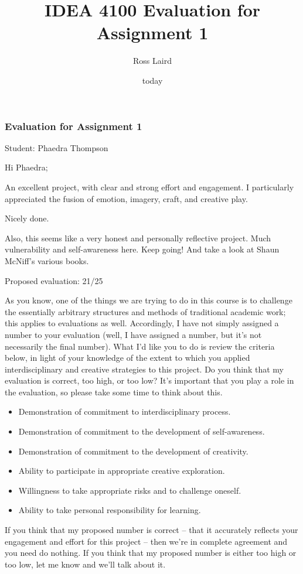 \documentclass[letterpaper,10pt,DIV=9,headsepline]{scrreprt}
\author{Ross Laird}
\title{IDEA 4100 Evaluation for Assignment 1}
\date{today}
\begin{document}
\pagestyle{scrheadings}
\setcounter{secnumdepth}{-1}

\subsubsection{Evaluation for Assignment 1}

Student: Phaedra Thompson

\bigskip
Hi Phaedra;

An excellent project, with clear and strong effort and engagement. I
particularly appreciated the fusion of emotion, imagery, craft, and
creative play.

Nicely done.

Also, this seems like a very honest and personally reflective project.
Much vulnerability and self-awareness here. Keep going! And take a look at Shaun McNiff's various books.


\bigskip
Proposed evaluation: 21/25

\bigskip
As you know, one of the things we are trying to do in this course is
to challenge the essentially arbitrary structures and methods of
traditional academic work; this applies to evaluations as well.
Accordingly, I have not simply assigned a number to your evaluation
(well, I have assigned a number, but it's not necessarily the final
number). What I'd like you to do is review the criteria below, in
light of your knowledge of the extent to which you applied
interdisciplinary and creative strategies to this project. Do you
think that my evaluation is correct, too high, or too low? It's
important that you play a role in the evaluation, so please take some
time to think about this.

\begin{itemize}
\item Demonstration of commitment to interdisciplinary process.
\item Demonstration of commitment to the development of self-awareness.
\item Demonstration of commitment to the development of creativity.
\item Ability to participate in appropriate creative exploration.
\item Willingness to take appropriate risks and to challenge oneself.
\item Ability to take personal responsibility for learning.
\end{itemize}

If you think that my proposed number is correct -- that it accurately
reflects your engagement and effort for this project -- then we're in
complete agreement and you need do nothing. If you think that my
proposed number is either too high or too low, let me know and we'll
talk about it.
\end{document}
